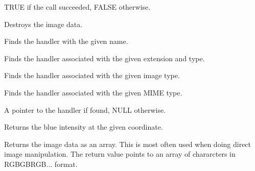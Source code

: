 
TRUE if the call succeeded, FALSE otherwise.

\label{wximagedestroy}


Destroys the image data.



Finds the handler with the given name.


Finds the handler associated with the given extension and type.


Finds the handler associated with the given image type.


Finds the handler associated with the given MIME type.






A pointer to the handler if found, NULL otherwise.



\label{wximagegetblue}


Returns the blue intensity at the given coordinate.

\label{wximagegetdata}


Returns the image data as an array. This is most often used when doing
direct image manipulation. The return value points to an array of
chararcters in RGBGBRGB... format.

